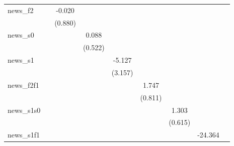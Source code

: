 {\begin{tabular}{l*{8}{c}}
\addlinespace
news\_f2     &                     &      -0.020         &                     &                     &                     &                     &                     &                     \\
            &                     &     (0.880)         &                     &                     &                     &                     &                     &                     \\
\addlinespace
news\_s0     &                     &                     &       0.088         &                     &                     &                     &                     &                     \\
            &                     &                     &     (0.522)         &                     &                     &                     &                     &                     \\
\addlinespace
news\_s1     &                     &                     &                     &      -5.127         &                     &                     &                     &                     \\
            &                     &                     &                     &     (3.157)         &                     &                     &                     &                     \\
\addlinespace
news\_f2f1   &                     &                     &                     &                     &       1.747\sym{**} &                     &                     &                     \\
            &                     &                     &                     &                     &     (0.811)         &                     &                     &                     \\
\addlinespace
news\_s1s0   &                     &                     &                     &                     &                     &       1.303\sym{**} &                     &                     \\
            &                     &                     &                     &                     &                     &     (0.615)         &                     &                     \\
\addlinespace
news\_s1f1   &                     &                     &                     &                     &                     &                     &     -24.364         &                     \\

\end{tabular}}

